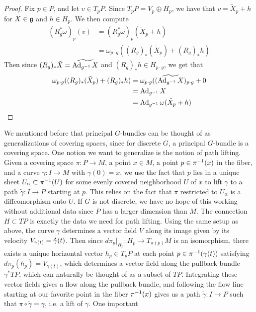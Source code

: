 %
\begin{proof}
Fix $p \in P$, and let $v \in T_pP$. Since $T_pP = V_p \oplus H_p$, we have
that $v = \tilde{X}_p + h$ for $X \in \mathfrak{g}$ and $h \in H_p$. We then compute
\begin{align*}
(R_g^*\omega)_p(v) &= (R_g^*\omega)_p(\tilde{X}_p + h) \\
&= \omega_{p \cdot g}((R_g)_*(\tilde{X}_p ) + (R_g)_*h)
\end{align*}
Then since $(R_g)_*\tilde{X} = \widetilde{\operatorname{Ad}_{g^{-1}}X}$ and
$(R_g)_*h \in H_{p \cdot g}$, we get that
\begin{align*}
\omega_{p \cdot g}((R_g)_*(\tilde{X}_p ) + (R_g)_*h) &=
\omega_{p \cdot g}((\widetilde{\operatorname{Ad}_{g^{-1}}X})_{p\cdot g} + 0 \\
&= \operatorname{Ad}_{g^{-1}} X \\
&= \operatorname{Ad}_{g^{-1}}\omega(\tilde{X}_p + h)
\end{align*}
\end{proof}
%
We mentioned before that principal $G$-bundles can be thought of as
generalizations of covering spaces, since for discrete $G$, a principal $G$-bundle
is a covering space. One notion we want to generalize is the notion of path
lifting. Given a covering space $\pi : P \to M$, a point $x \in M$, a point
$p \in \pi^{-1}(x)$ in the fiber, and a curve $\gamma : I \to M$ with
$\gamma(0) = x$, we use the fact that $p$ lies in a unique sheet
$U_\alpha \subset \pi^{-1}(U)$ for some evenly covered neighborhood $U$ of $x$
to lift $\gamma$ to a path $\tilde{\gamma} : I \to P$ starting at $p$. This relies
on the fact that $\pi$ restricted to $U_\alpha$ is a diffeomorphism onto $U$.
If $G$ is not discrete, we have no hope of this working without additional data
since $P$ has a larger dimension than $M$. The connection $H \subset TP$ is
exactly the data we need for path lifting. Using the same setup as above,
the curve $\gamma$ determines a vector field $V$ along its image given by
its velocity $V_{\gamma(t)} = \accentset{\mbox{\large\bfseries .}}{\gamma}(t)$. Then since
$d\pi_p\vert_{H_p} : H_p \to T_{\pi(p)}M$ is an isomorphism, there exists
a unique horizontal vector $h_p \in T_pP$ at each point $p \in \pi^{-1}(\gamma(t))$
satisfying $d\pi_p(h_p) = V_{\gamma(t)}$, which determines a vector field along
the pullback bundle $\gamma^*TP$, which can naturally be thought of as a subset
of $TP$. Integrating these vector fields gives a flow along the pullback bundle,
and following the flow line starting at our favorite point in the fiber
$\pi^{-1}(x)$ gives us a path $\tilde{\gamma} : I \to P$ such that
$\pi \circ \tilde{\gamma} = \gamma$, i.e. a lift of $\gamma$. One important
